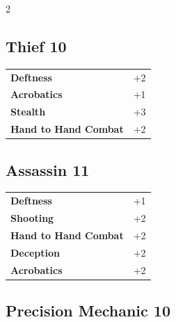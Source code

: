 \begin{multicols}{2}
\begin{tcolorbox}
\end{tcolorbox}

\begin{tcolorbox}
    \subsection*{Thief \hfill \small{10 }}
    \tcblower




\begin{tabular}{@{}ll@{}}
    \textbf{Deftness} & +2\\
    \textbf{Acrobatics} & +1\\
    \textbf{Stealth} & +3\\
    \textbf{Hand to Hand Combat} & +2\\
\end{tabular}


\end{tcolorbox}

\begin{tcolorbox}
    \subsection*{Assassin \hfill \small{11 }}
    \tcblower




\begin{tabular}{@{}ll@{}}
    \textbf{Deftness} & +1\\
    \textbf{Shooting} & +2\\
    \textbf{Hand to Hand Combat} & +2\\
    \textbf{Deception} & +2\\
    \textbf{Acrobatics} & +2\\
\end{tabular}


\end{tcolorbox}

\begin{tcolorbox}
    \subsection*{Precision Mechanic \hfill \small{10 }}
    \tcblower





\end{tcolorbox}
\end{multicols}
